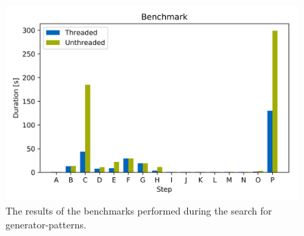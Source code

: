 \begin{figure}
	\centering
	\includegraphics[width=0.8\linewidth]{figures/Benchmark/benchmark.png}
	\caption[Benchmark]{The results of the benchmarks performed during the search for generator-patterns. 
}
	\label{fig:benchmark}
\end{figure}